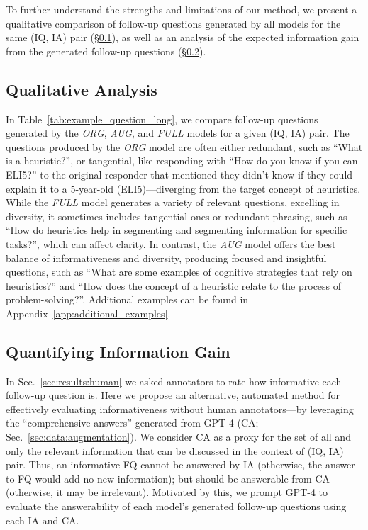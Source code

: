 To further understand the strengths and limitations of our method, we present a qualitative comparison of follow-up questions generated by all models for the same (IQ, IA) pair (\S\ref{sec:analysis:casestudy}), as well as an analysis of the expected information gain from the generated follow-up questions (\S\ref{sec:analysis:infogain}). 

\subsection{Qualitative Analysis}
\label{sec:analysis:casestudy}

In Table~\ref{tab:example_question_long}, we compare follow-up questions generated by the \textit{ORG}, \textit{AUG}, and \textit{FULL} models for a given (IQ, IA) pair. The questions produced by the \textit{ORG} model are often either redundant, such as ``What is a heuristic?'', or tangential, like responding with ``How do you know if you can ELI5?'' to the original responder that mentioned they didn't know if they could explain it to a 5-year-old (ELI5)---diverging from the target concept of heuristics. While the \textit{FULL} model generates a variety of relevant questions, excelling in diversity, it sometimes includes tangential ones or redundant phrasing, such as ``How do heuristics help in segmenting and segmenting information for specific tasks?'', which can affect clarity. In contrast, the \textit{AUG} model offers the best balance of informativeness and diversity, producing focused and insightful questions, such as ``What are some examples of cognitive strategies that rely on heuristics?'' and ``How does the concept of a heuristic relate to the process of problem-solving?''. Additional examples can be found in Appendix~\ref{app:additional_examples}.

\subsection{Quantifying Information Gain}
\label{sec:analysis:infogain}

In Sec.~\ref{sec:results:human} we asked annotators to rate how informative each follow-up question is. Here we propose an alternative, automated method for effectively evaluating informativeness without human annotators---by leveraging the ``comprehensive answers'' generated from GPT-4 (CA; Sec.~\ref{sec:data:augmentation}). We consider CA as a proxy for the set of all and only the relevant information that can be discussed in the context of (IQ, IA) pair. Thus, an informative FQ cannot be answered by IA (otherwise, the answer to FQ would add no new information); but should be answerable from CA (otherwise, it may be irrelevant). Motivated by this, we prompt GPT-4 to evaluate the answerability of each model's generated follow-up questions using each IA and CA. %


